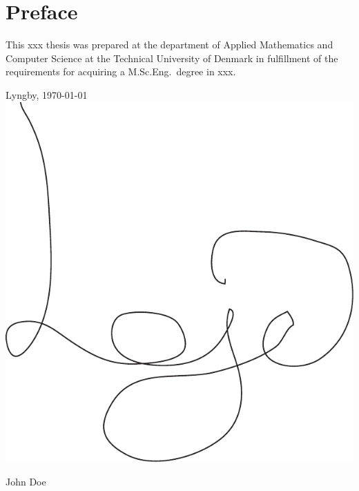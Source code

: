 \chapter{Preface}
This xxx thesis was prepared at the department of Applied Mathematics and Computer Science at the Technical University of Denmark in fulfillment of the requirements for acquiring a M.Sc.Eng.\ degree in xxx.

\vspace{20mm}
\begin{center}
    \hspace{20mm} Lyngby, \today
    \vspace{5mm}
    \newline
    \includegraphics[scale=0.5]{graphics/Signature}
\end{center}
\begin{flushright}
    John Doe
\end{flushright}


